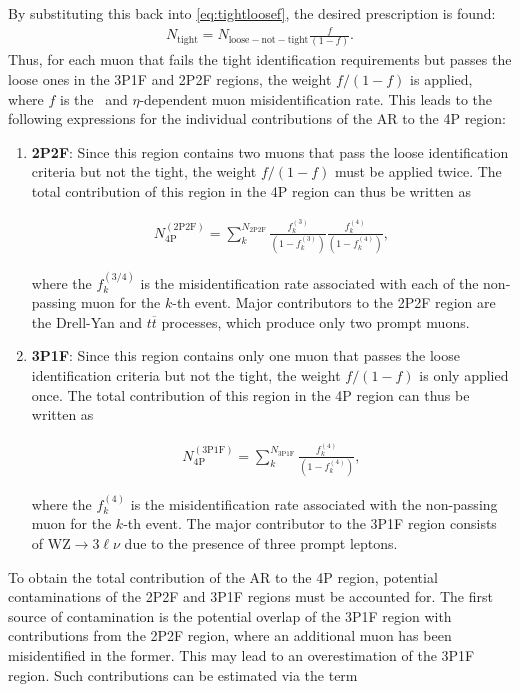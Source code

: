 By substituting this back into \autoref{eq:tightloosef}, the desired prescription is found:
\begin{align}
\label{eq:extrapolationprescription}
    N_{\mathrm{tight}} = N_{\mathrm{loose-not-tight}} \frac{f}{(1-f)}.
\end{align}
Thus, for each muon that fails the tight identification requirements but passes the loose ones in the 3P1F and 2P2F regions, the weight $f/(1-f)$ is applied, where $f$ is the \pt \, and $\eta$-dependent muon misidentification rate. This leads to the following expressions for the individual contributions of the AR to the 4P region:

\begin{enumerate}
    \item \textbf{2P2F}: Since this region contains two muons that pass the loose identification criteria but not the tight, the weight $f/(1-f)$ must be applied twice. The total contribution of this region in the 4P region can thus be written as

    \begin{align}
        N_{\mathrm{4P}}^{\mathrm{(2P2F)}} = \sum_{k}^{N_{\mathrm{2P2F}}} \frac{f_k^{(3)}}{(1-f_k^{(3)})} \frac{f_k^{(4)}}{(1-f_k^{(4)})},
    \end{align}

    where the $f_k^{(3/4)}$ is the misidentification rate associated with each of the non-passing muon for the $k$-th event. Major contributors to the 2P2F region are the Drell-Yan and $t\overline{t}$ processes, which produce only two prompt muons. 

    \item \textbf{3P1F}: Since this region contains only one muon that passes the loose identification criteria but not the tight, the weight $f/(1-f)$ is only applied once. The total contribution of this region in the 4P region can thus be written as

    \begin{align}
        N_{\mathrm{4P}}^{\mathrm{(3P1F)}} = \sum_{k}^{N_{\mathrm{3P1F}}}\frac{f_k^{(4)}}{(1-f_k^{(4)})},
    \end{align}

    where the $f_k^{(4)}$ is the misidentification rate associated with the non-passing muon for the $k$-th event. The major contributor to the 3P1F region consists of WZ$\rightarrow3\ell\nu$ due to the presence of three prompt leptons. 
\end{enumerate}
To obtain the total contribution of the AR to the 4P region, potential contaminations of the 2P2F and 3P1F regions must be accounted for. The first source of contamination is the potential overlap of the 3P1F region with contributions from the 2P2F region, where an additional muon has been misidentified in the former. This may lead to an overestimation of the 3P1F region. Such contributions can be estimated via the term
